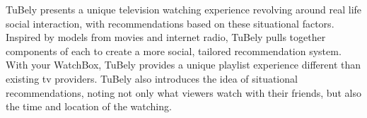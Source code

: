 TuBely presents a unique television watching experience revolving
around real life social interaction, with recommendations based on
these situational factors.  Inspired by models from movies and
internet radio, TuBely pulls together components of each to create a
more social, tailored recommendation system.  With your WatchBox,
TuBely provides a unique playlist experience different than existing
tv providers.  TuBely also introduces the idea of situational
recommendations, noting not only what viewers watch with their
friends, but also the time and location of the watching.

